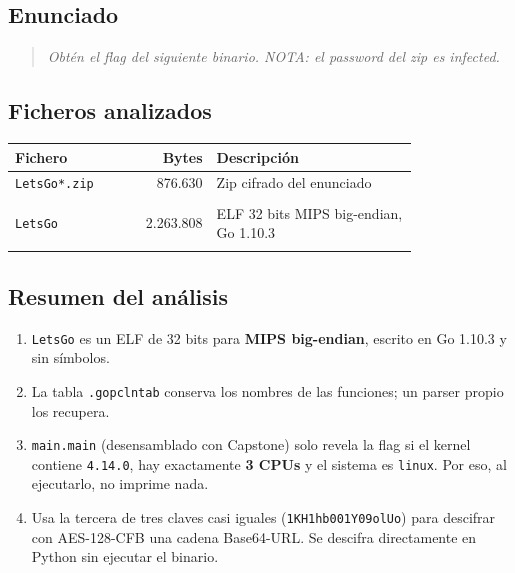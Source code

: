 \documentclass[11pt,a4paper]{article}
\begin{document}
\subsection{Enunciado}
\begin{quote}\itshape Obtén el flag del siguiente binario. NOTA: el password del zip es infected.\end{quote}

\subsection{Ficheros analizados}
\begin{longtable}{@{}L{0.30\linewidth}r L{0.50\linewidth}@{}}
\toprule \textbf{Fichero} & \textbf{Bytes} & \textbf{Descripción} \\ \midrule \endhead
\texttt{LetsGo*.zip} & 876.630 & Zip cifrado del enunciado \\ \nopagebreak
{} \\ \midrule
\texttt{LetsGo} & 2.263.808 & ELF 32 bits MIPS big-endian, Go 1.10.3 \\ \nopagebreak
{} \\ \midrule
\end{longtable}

\subsection{Resumen del análisis}
\begin{enumerate}
  \item \texttt{LetsGo} es un ELF de 32 bits para \textbf{MIPS big-endian}, escrito en Go 1.10.3 y sin símbolos.
  \item La tabla \texttt{.gopclntab} conserva los nombres de las funciones; un parser propio los recupera.
  \item \texttt{main.main} (desensamblado con Capstone) solo revela la flag si el kernel contiene \texttt{4.14.0}, hay
        exactamente \textbf{3 CPUs} y el sistema es \texttt{linux}. Por eso, al ejecutarlo, no imprime nada.
  \item Usa la tercera de tres claves casi iguales (\texttt{1KH1hb001Y09olUo}) para descifrar con AES-128-CFB una
        cadena Base64-URL. Se descifra directamente en Python sin ejecutar el binario.
\end{enumerate}
\end{document}
